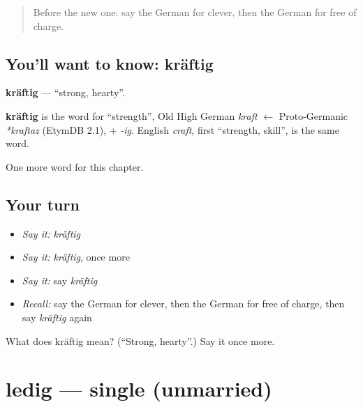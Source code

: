 \label{lesson:GE-C217-kraeftig}



\begin{quote}
Before the new one: say the German for clever, then the German for free of charge.
\end{quote}

\subsection*{You'll want to know: kräftig}
\textbf{kräftig} — \textquotedblleft{}strong, hearty\textquotedblright{}.

\begin{cousinweb}
\textbf{kräftig} is the word for \textquotedblleft{}strength\textquotedblright{}, Old High German \emph{kraft} $\leftarrow$ Proto-Germanic \emph{*kraftaz} (EtymDB 2.1), + \emph{-ig}. English \emph{craft}, first \textquotedblleft{}strength, skill\textquotedblright{}, is the same word.
\end{cousinweb}

\begin{grammarlens}[title={What you've built}]
One more word for this chapter.
\end{grammarlens}

\subsection*{Your turn}
\begin{itemize}
\raggedright
  \item \emph{Say it:} \emph{kräftig}
  \item \emph{Say it:} \emph{kräftig}, once more
  \item \emph{Say it:} say \emph{kräftig}
  \item \emph{Recall:} say the German for clever, then the German for free of charge, then say \emph{kräftig} again
\end{itemize}

\begin{tcolorbox}[breakable,colback=teal!4,colframe=teal!35!black,title={Before you move on}]
What does kräftig mean? (\textquotedblleft{}Strong, hearty\textquotedblright{}.) Say it once more.
\end{tcolorbox}
\section[ledig]{ledig — single (unmarried)}

